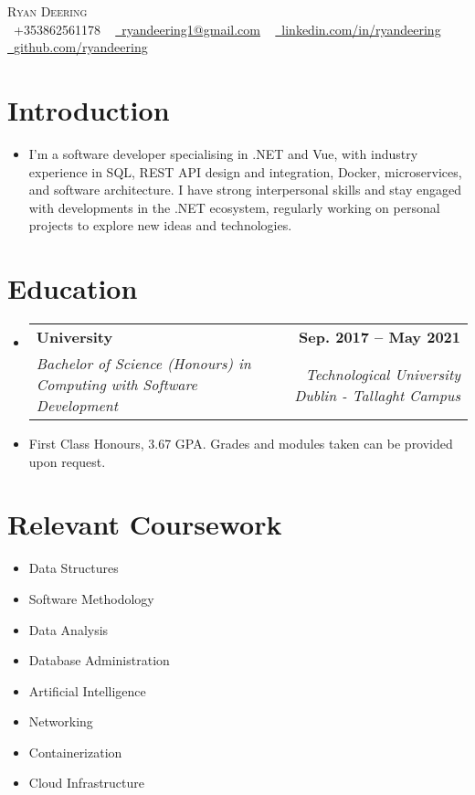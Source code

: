 \documentclass[letterpaper,11pt]{article}
\makeatletter
\newcommand{\resumeSubheading}[4]{
  \vspace{-2pt}\item
    \begin{tabular*}{1.0\textwidth}[t]{l@{\extracolsep{\fill}}r}
      \textbf{#1} & \textbf{\small #2} \\
      \textit{\small#3} & \textit{\small #4} \\
    \end{tabular*}\vspace{-7pt}
}
\newcommand{\resumeSubHeadingListStart}{\begin{itemize}[leftmargin=0.0in, label={}]}
\newcommand{\resumeSubHeadingListEnd}{\end{itemize}}
\makeatother
\begin{document}
\begin{center}
	{\Huge \scshape Ryan Deering} \\ \vspace{4pt}
	\small \raisebox{-0.1\height}\faPhone\ +353862561178 ~ \href{mailto:ryandeering1@gmail.com}{\raisebox{-0.2\height}\faEnvelope\  \underline{ryandeering1@gmail.com}} ~ 
	\href{https://www.linkedin.com/in/ryandeering/}{\raisebox{-0.2\height}\faLinkedin\ \underline{linkedin.com/in/ryandeering}}  ~
	\href{https://github.com/ryandeering}{\raisebox{-0.2\height}\faGithub\ \underline{github.com/ryandeering}}
	\vspace{-8pt}
\end{center}

\vspace{1pt}
\section{Introduction}
\resumeSubHeadingListStart
\item {I'm a software developer specialising in .NET and Vue, with industry experience in SQL, REST API design and integration, Docker, microservices, and software architecture. I have strong interpersonal skills and stay engaged with developments in the .NET ecosystem, regularly working on personal projects to explore new ideas and technologies.}
\resumeSubHeadingListEnd

\section{Education}
\resumeSubHeadingListStart
\resumeSubheading
{University}{Sep. 2017 -- May 2021}
{Bachelor of Science (Honours) in Computing with Software Development}{Technological University Dublin - Tallaght Campus}
\item {First Class Honours, 3.67 GPA. Grades and modules taken can be provided upon request.}
\resumeSubHeadingListEnd

\section{Relevant Coursework}
\begin{multicols}{4}
	\begin{itemize}[itemsep=-5pt, parsep=3pt]
		\item\small Data Structures
		\item Software Methodology
		\item Data Analysis
		\item Database Administration
		\item Artificial Intelligence
		\item Networking
		\item Containerization 
		\item Cloud Infrastructure
	\end{itemize}
\end{multicols}
\vspace*{1.6\multicolsep}
\end{document}
